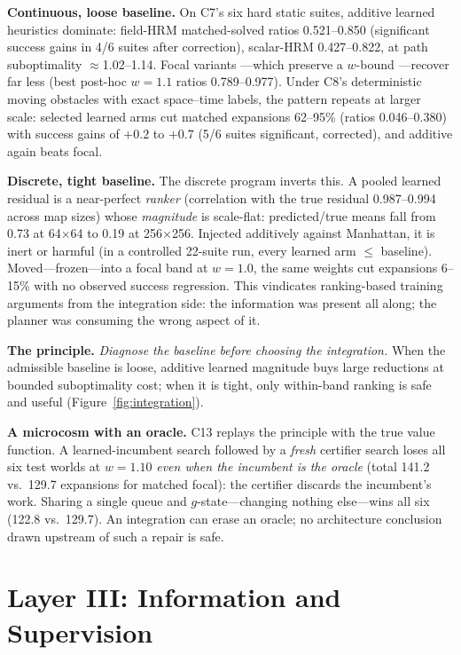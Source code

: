 \documentclass[letterpaper]{article} %
\newcommand{\stage}[1]{\textsc{#1}}
\begin{document}
\textbf{Continuous, loose baseline.} On \stage{C7}'s six hard static suites, additive learned heuristics dominate: field-HRM matched-solved ratios 0.521--0.850 (significant success gains in 4/6 suites after correction), scalar-HRM 0.427--0.822, at path suboptimality $\approx$1.02--1.14. Focal variants \citep{pearl1982semiadmissible}---which preserve a $w$-bound \citep{pohl1970}---recover far less (best post-hoc $w{=}1.1$ ratios 0.789--0.977). Under \stage{C8}'s deterministic moving obstacles with exact space--time labels, the pattern repeats at larger scale: selected learned arms cut matched expansions 62--95\% (ratios 0.046--0.380) with success gains of $+0.2$ to $+0.7$ (5/6 suites significant, corrected), and additive again beats focal.

\textbf{Discrete, tight baseline.} The discrete program inverts this. A pooled learned residual is a near-perfect \emph{ranker} (correlation with the true residual 0.987--0.994 across map sizes) whose \emph{magnitude} is scale-flat: predicted/true means fall from 0.73 at 64$\times$64 to 0.19 at 256$\times$256. Injected additively against Manhattan, it is inert or harmful (in a controlled 22-suite run, every learned arm $\leq$ baseline). Moved---frozen---into a focal band at $w{=}1.0$, the same weights cut expansions 6--15\% with no observed success regression. This vindicates ranking-based training arguments \citep{chrestien2023rank} from the integration side: the information was present all along; the planner was consuming the wrong aspect of it.

\textbf{The principle.} \emph{Diagnose the baseline before choosing the integration.} When the admissible baseline is loose, additive learned magnitude buys large reductions at bounded suboptimality cost; when it is tight, only within-band ranking is safe and useful (Figure~\ref{fig:integration}).

\textbf{A microcosm with an oracle.} \stage{C13} replays the principle with the true value function. A learned-incumbent search followed by a \emph{fresh} certifier search loses all six test worlds at $w{=}1.10$ \emph{even when the incumbent is the oracle} (total 141.2 vs.\ 129.7 expansions for matched focal): the certifier discards the incumbent's work. Sharing a single queue and $g$-state---changing nothing else---wins all six (122.8 vs.\ 129.7). An integration can erase an oracle; no architecture conclusion drawn upstream of such a repair is safe.

\section{Layer III: Information and Supervision}
\end{document}
